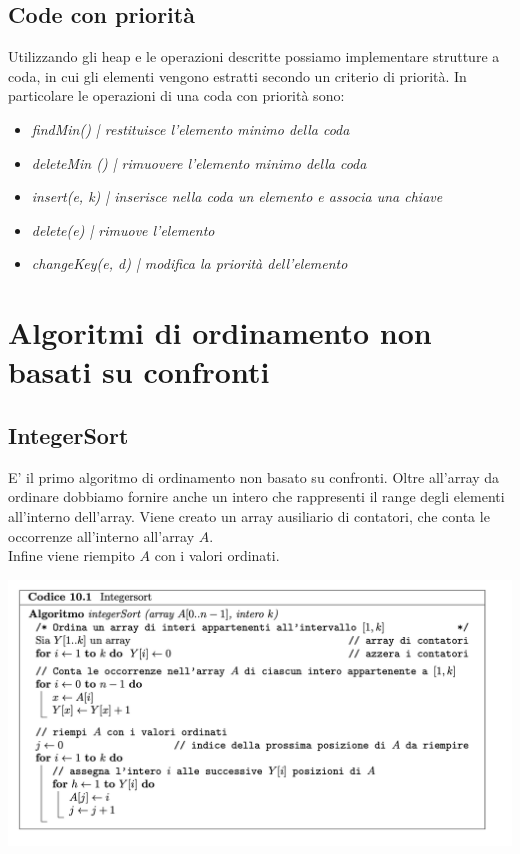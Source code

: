 \documentclass[11pt, oneside]{article}   	%
\begin{document}
\subsection*{Code con priorità}
Utilizzando gli heap e le operazioni descritte possiamo implementare strutture a coda, in cui gli elementi vengono estratti secondo un criterio di priorità. In particolare le operazioni di una coda con priorità sono:
\begin{itemize}
\item \emph{findMin() | restituisce l'elemento minimo della coda}
\item \emph{deleteMin () | rimuovere l'elemento minimo della coda}
\item \emph{insert(e, k) | inserisce nella coda un elemento e associa una chiave}
\item \emph{delete(e) | rimuove l'elemento}
\item \emph{changeKey(e, d) | modifica la priorità dell'elemento}
\end{itemize}

\section*{Algoritmi di ordinamento non basati su confronti}
\subsection*{IntegerSort}
E' il primo algoritmo di ordinamento non basato su confronti. Oltre all'array da ordinare dobbiamo fornire anche un intero che rappresenti il range degli elementi all'interno dell'array. Viene creato un array ausiliario di contatori, che conta le occorrenze all'interno all'array $A$.\\ Infine viene riempito $A$ con i valori ordinati. 
\begin{center}
\includegraphics[scale=0.7]{integer}
\end{center}
\end{document}
